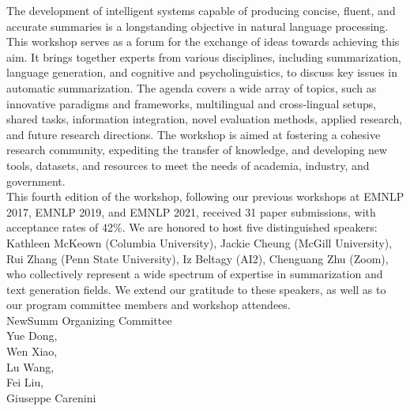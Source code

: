 The development of intelligent systems capable of producing concise, fluent, and accurate summaries is a longstanding objective in natural language processing. This workshop serves as a forum for the exchange of ideas towards achieving this aim. It brings together experts from various disciplines, including summarization, language generation, and cognitive and psycholinguistics, to discuss key issues in automatic summarization. The agenda covers a wide array of topics, such as innovative paradigms and frameworks, multilingual and cross-lingual setups, shared tasks, information integration, novel evaluation methods, applied research, and future research directions. The workshop is aimed at fostering a cohesive research community, expediting the transfer of knowledge, and developing new tools, datasets, and resources to meet the needs of academia, industry, and government.
\\

This fourth edition of the workshop, following our previous workshops at EMNLP 2017, EMNLP 2019, and EMNLP 2021, received 31 paper submissions, with acceptance rates of 42\%. We are honored to host five distinguished speakers: Kathleen McKeown (Columbia University), Jackie Cheung (McGill University), Rui Zhang (Penn State University), Iz Beltagy (AI2), Chenguang Zhu (Zoom), who collectively represent a wide spectrum of expertise in summarization and text generation fields. We extend our gratitude to these speakers, as well as to our program committee members and workshop attendees.
\\

NewSumm Organizing Committee \\
Yue Dong, \\
Wen Xiao,\\
Lu Wang,\\
Fei Liu,\\
Giuseppe Carenini\\
